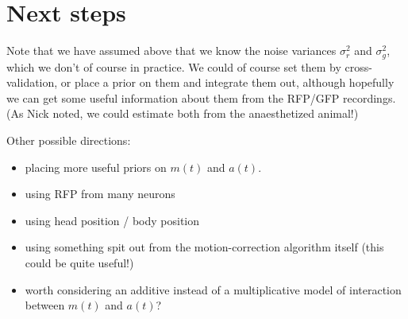 \documentclass[11pt]{article}
\newcommand{\vr}{\sigma^2_r}
\newcommand{\vg}{\sigma^2_g}
\begin{document}
\section{Next steps}
Note that we have assumed above that we know the noise variances $\vr$
and $\vg$, which we don't of course in practice. We could of course
set them by cross-validation, or place a prior on them and integrate
them out, although hopefully we can get some useful information about
them from the RFP/GFP recordings.  (As Nick noted, we could estimate
both from the anaesthetized animal!)


Other possible directions: 
\begin{itemize}
\item placing more useful priors on $m(t)$ and $a(t)$. 
\item using RFP from many neurons
\item using head position / body position
\item using something spit out from the motion-correction algorithm
  itself (this could be quite useful!)
\item worth considering an additive instead of a multiplicative model
  of interaction between $m(t)$ and $a(t)$?
\end{itemize}



%
%
\end{document}
